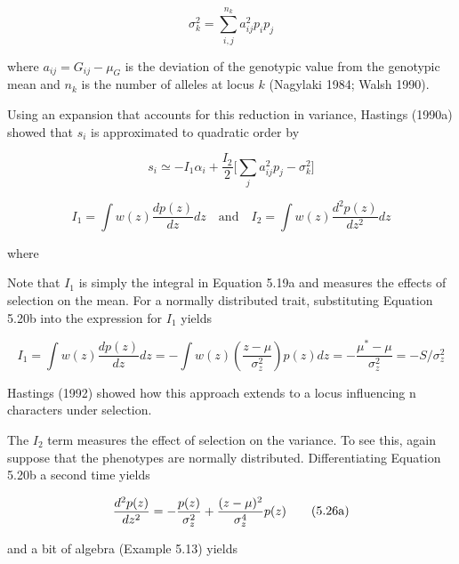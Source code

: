 \documentclass{article}
\begin{document}
\begin{equation}
\sigma_{k}^{2}=\sum_{i,j}^{n_{k}}a_{ij}^{2}p_{i}p_{j}
\end{equation}

where  $ a_{ij} = G_{ij} - \mu_G $ is the deviation of the genotypic value from the genotypic mean and  $ n_k $ is the number of alleles at locus  $ k $ (Nagylaki 1984; Walsh 1990).

Using an expansion that accounts for this reduction in variance, Hastings (1990a) showed that  $ s_{i} $ is approximated to quadratic order by

\begin{equation}
s_{i}\simeq-I_{1}\alpha_{i}+\frac{I_{2}}{2}\biggl[\sum_{j}a_{i j}^{2}p_{j}-\sigma_{k}^{2}\biggr]
\tag{5.25a}
\label{eq:5_25a}
\end{equation}

\begin{equation}
I_{1}=\int w(z)\frac{d p(z)}{d z}d z\quad\mathrm{a n d}\quad I_{2}=\int w(z)\frac{d^{2}p(z)}{d z^{2}}d z
\tag{5.25b}
\label{eq:5_25b}
\end{equation}

where

Note that  $ I_{1} $ is simply the integral in Equation 5.19a and measures the effects of selection on the mean. For a normally distributed trait, substituting Equation 5.20b into the expression for  $ I_{1} $ yields

\begin{equation}
I_{1}=\int w(z)\frac{d p(z)}{d z}d z=-\int w(z)\left(\frac{z-\mu}{\sigma_{z}^{2}}\right)p(z)d z=-\frac{\mu^{*}-\mu}{\sigma_{z}^{2}}=-S/\sigma_{z}^{2}
\tag{5.25c}
\label{eq:5_25c}
\end{equation}

Hastings (1992) showed how this approach extends to a locus influencing n characters under selection.

The  $ I_{2} $ term measures the effect of selection on the variance. To see this, again suppose that the phenotypes are normally distributed. Differentiating Equation 5.20b a second time yields

\begin{equation}
\begin{align*}{d^2p(z)\over dz^2}=-{p(z)\over\sigma_z^2}+{(z-\mu)^2\over\sigma_z^4}p(z)\end{align*}
\tag{5.26a}
\label{eq:5_26a}
\end{equation}

and a bit of algebra (Example 5.13) yields
\end{document}
